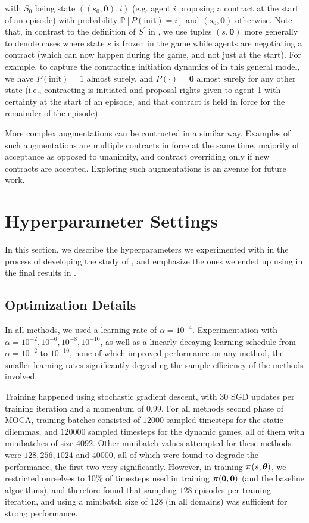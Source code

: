 with $S_0$ being state $((s_0, \boldsymbol 0), i)$ (e.g. agent $i$ proposing a contract at the start of an episode) with probability $\mathbb{P}[P(\textrm{init})=i]$ and $(s_0, \boldsymbol 0)$ otherwise. Note that, in contrast to the definition of $S^\prime$ in , we use tuples $(s, \boldsymbol 0)$ more generally to denote cases where state $s$ is frozen in the game while agents are negotiating a contract (which can now happen during the game, and not just at the start). For example, to capture the contracting initiation dynamics of  in this general model, we have $P(\textrm{init}) = 1$ almost surely, and $P(\cdot) = \boldsymbol 0$ almost surely for any other state (i.e., contracting is initiated and proposal rights given to agent 1 with certainty at the start of an episode, and that contract is held in force for the remainder of the episode).

More complex augmentations can be contructed in a similar way. Examples of such augmentations are multiple contracts in force at the same time, majority of acceptance as opposed to unanimity, and contract overriding only if new contracts are accepted. Exploring such augmentations is an avenue for future work.
\section{Hyperparameter Settings}\label{apx:hyperparameters}
In this section, we describe the hyperparameters we experimented with in the process of developing the study of , and emphasize the ones we ended up using in the final results in . 

\subsection{Optimization Details} In all methods, we used a learning rate of $\alpha = 10^{-4}$. Experimentation with $\alpha = 10^{-2}, 10^{-6}, 10^{-8}, 10^{-10}$, as well as a linearly decaying learning schedule from $\alpha=10^{-2}$ to $10^{-10}$, none of which improved performance on any method, the smaller learning rates significantly degrading the sample efficiency of the methods involved. 

Training happened using stochastic gradient descent, with $30$ SGD updates per training iteration and a momentum of $0.99$. For all methods second phase of MOCA, training batches consisted of ${12000}$ sampled timesteps for the static dilemmas, and ${120000}$ sampled timesteps for the dynamic games, all of them with minibatches of size ${4092}$. Other minibatch values attempted for these methods were $128, 256, {1024}$ and ${40000}$, all of which were found to degrade the performance, the first two very significantly. However, in training $\boldsymbol{\boldsymbol{\pi}}(s, \boldsymbol{\boldsymbol{\theta}})$, we restricted ourselves to 10\% of timesteps used in training $\boldsymbol{\boldsymbol{\pi}}(\boldsymbol 0, \boldsymbol 0)$ (and the baseline algorithms), and therefore found that sampling $128$ episodes per training iteration, and using a minibatch size of $128$ (in all domains) was sufficient for strong performance.

